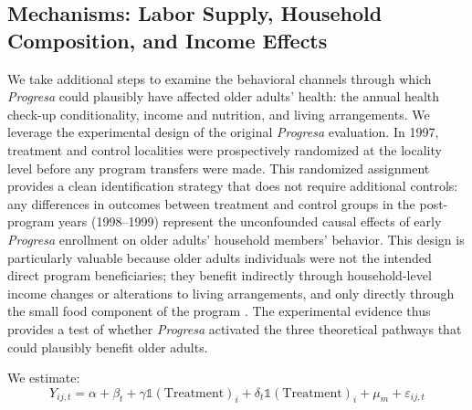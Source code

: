 \documentclass[12pt]{article}
\begin{document}

\subsection{Mechanisms: Labor Supply, Household Composition, and Income Effects}\label{s:mechanisms}

\p We take additional steps to examine the behavioral channels through which \textit{Progresa} could plausibly have affected older adults' health: the annual health check-up conditionality, income and nutrition, and living arrangements. We leverage the experimental design of the original \textit{Progresa} evaluation. In 1997, treatment and control localities were prospectively randomized at the locality level before any program transfers were made. This randomized assignment provides a clean identification strategy that does not require additional controls: any differences in outcomes between treatment and control groups in the post-program years (1998--1999) represent the unconfounded causal effects of early \textit{Progresa} enrollment on older adults' household members' behavior. This design is particularly valuable because older adults individuals were not the intended direct program beneficiaries; they benefit indirectly through household-level income changes or alterations to living arrangements, and only directly through the small food component of the program . The experimental evidence thus provides a test of whether \textit{Progresa} activated the three theoretical pathways that could plausibly benefit older adults.

\p We estimate:
\begin{equation}\label{eq:exp_did}
Y_{ij,t} = \alpha + \beta_t + \gamma \mathds{1}(\text{Treatment})_i + \delta_t \mathds{1}(\text{Treatment})_i + \mu_m + \varepsilon_{ij,t}
\end{equation}
\end{document}
